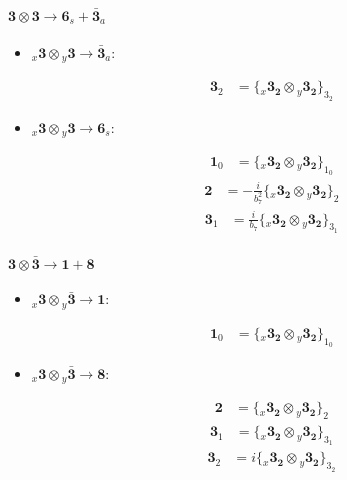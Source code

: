 \documentclass[english]{article}
\newcommand{\cgEqFontsize}{\large}
\newcommand{\rep}[1]{\mathbf{#1}}
\newcommand{\repx}[2]{{}_{#2}\mathbf{#1}}
\newcommand{\tsprod}[2]{\rep{#1}\otimes\rep{#2}}
\newcommand{\tsprodx}[2]{\repx{#1}{x}\otimes\repx{#2}{y}}
\newcommand{\subcgs}[3]{\big\{ \tsprodx{#1}{#2}\big\}^{}_{#3}}
\newcommand{\bfl}{\begin{fleqn}[25pt]}
\newcommand{\efl}{\end{fleqn}}
\begin{document}
\paragraph*{\cgEqFontsize $\tsprod{3}{3}\to\rep{6}_s+\rep{\bar{3}}_a$}
\begin{itemize}
\item $\tsprodx{3}{3}\to\rep{\bar{3}}_{a}$:
\bfl
\begin{align*}
\rep{3}_{2} & = \subcgs{3_{2}}{3_{2}}{3_{2}}
\end{align*}
\efl
\item $\tsprodx{3}{3}\to\rep{6}_{s}$:
\bfl
\begin{align*}
\rep{1}_{0} & = \subcgs{3_{2}}{3_{2}}{1_{0}}
\end{align*}
\begin{align*}
\rep{2} & = -\frac{i}{b_7^2}\subcgs{3_{2}}{3_{2}}{2}
\end{align*}
\begin{align*}
\rep{3}_{1} & = \frac{i}{b_7}\subcgs{3_{2}}{3_{2}}{3_{1}}
\end{align*}
\efl
\end{itemize}
\paragraph*{\cgEqFontsize $\tsprod{3}{\bar{3}}\to\rep{1}+\rep{8}$}
\begin{itemize}
\item $\tsprodx{3}{\bar{3}}\to\rep{1}$:
\bfl
\begin{align*}
\rep{1}_{0} & = \subcgs{3_{2}}{3_{2}}{1_{0}}
\end{align*}
\efl
\item $\tsprodx{3}{\bar{3}}\to\rep{8}$:
\bfl
\begin{align*}
\rep{2} & = \subcgs{3_{2}}{3_{2}}{2}
\end{align*}
\begin{align*}
\rep{3}_{1} & = \subcgs{3_{2}}{3_{2}}{3_{1}}
\end{align*}
\begin{align*}
\rep{3}_{2} & = i\subcgs{3_{2}}{3_{2}}{3_{2}}
\end{align*}
\efl
\end{itemize}
\end{document}
